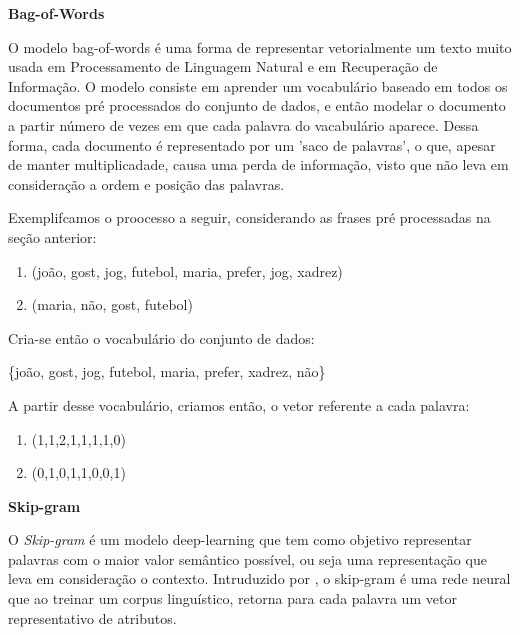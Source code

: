 \documentclass[a4paper,12pt]{article}
\begin{document}
\begin{description}
    
  \item \textbf{Bag-of-Words}
  
   O modelo bag-of-words é uma forma de representar vetorialmente um texto muito usada em Processamento de Linguagem Natural e em
   Recuperação de Informação. O modelo consiste em aprender um vocabulário baseado em todos
   os documentos pré processados do conjunto de dados, e então modelar o documento a partir número de vezes em que
   cada palavra do vacabulário aparece. Dessa forma, cada documento é representado por um 'saco de palavras', o que, apesar de manter
   multiplicadade, causa uma perda de informação, visto que não leva em consideração a ordem  e posição das palavras.
   
   Exemplifcamos o proocesso a seguir, considerando as frases pré processadas na seção anterior:
   
    \begin{center}
      \begin{enumerate}
	\item (joão, gost, jog, futebol, maria, prefer, jog, xadrez)
	\item (maria, não, gost, futebol)
      \end{enumerate}
    \end{center}
    
    Cria-se então o vocabulário do conjunto de dados:
    
   \begin{center}
    \{joão, gost, jog, futebol, maria, prefer, xadrez, não\}
   \end{center}

   A partir desse vocabulário, criamos então, o vetor referente a cada palavra:

    \begin{center}
      \begin{enumerate}
	\item (1,1,2,1,1,1,1,0)
	\item (0,1,0,1,1,0,0,1)
      \end{enumerate}
    \end{center}
   
 
 \item \textbf{Skip-gram}

  O \textit{Skip-gram} é um modelo deep-learning que tem como objetivo representar palavras com o maior valor semântico possível, ou seja
  uma representação que leva em consideração o contexto. Intruduzido
  por \cite{mikolov2013efficient}, o skip-gram é uma rede neural que ao treinar um corpus linguístico, retorna para cada palavra um vetor 
  representativo de atributos.
  

\end{description}
\end{document}
